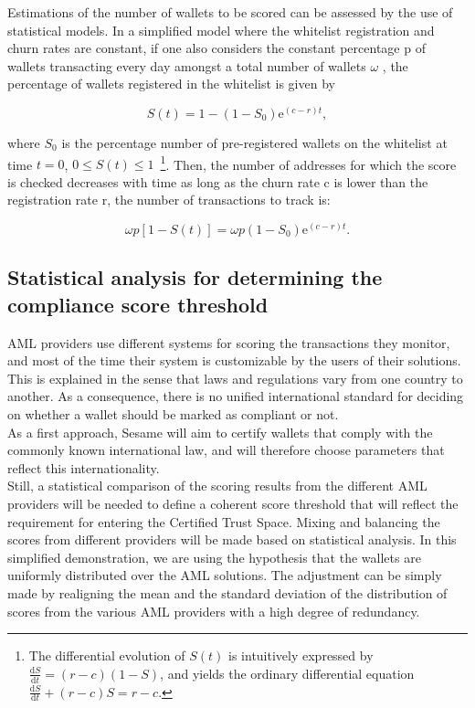 ﻿\documentclass[a4paper]{article}
\begin{document}
Estimations of the number of wallets to be scored can be assessed by the use of statistical models. In a simplified model where the whitelist registration and churn rates are constant, if one also considers the constant percentage p of wallets transacting every day amongst a total number of wallets $\omega$ , the percentage of wallets registered in the whitelist is given by  

$$S(t)=1-\left(1-S_0\right)\mathrm{e}^{(c-r)t},$$

\noindent where $S_0$ is the percentage number of pre-registered wallets on the whitelist at time $t=0$, $0\le S(t)\le 1$~\footnote{The differential evolution of $S(t)$ is intuitively expressed by $\frac{\mathrm{d}S}{\mathrm{d}t}=(r-c)(1-S)$, and yields the ordinary differential equation $\frac{\mathrm{d}S}{\mathrm{d}t}+(r-c)S=r-c$.}.
Then, the number of addresses for which the score is checked decreases with time as long as the churn rate c is lower than the registration rate r, the number of transactions to track is:

$$\omega p\left[1-S(t)\right]=\omega p\left(1-S_0\right)\mathrm{e}^{(c-r)t}.$$

\subsection{Statistical analysis for determining the compliance score threshold}
AML providers use different systems for scoring the transactions they monitor, and most of the time their system is customizable by the users of their solutions. This is explained in the sense that laws and regulations vary from one country to another. As a consequence, there is no unified international standard for deciding on whether a wallet should be marked as compliant or not. \\

As a first approach, Sesame will aim to certify wallets that comply with the commonly known international law, and will therefore choose parameters that reflect this internationality. \\

Still, a statistical comparison of the scoring results from the different AML providers will be needed to define a coherent score threshold that will reflect the requirement for entering the Certified Trust Space. Mixing and balancing the scores from different providers will be made based on statistical analysis. In this simplified demonstration, we are using the hypothesis that the wallets are uniformly distributed over the AML solutions. The adjustment can be simply made by realigning the mean and the standard deviation of the distribution of scores from the various AML providers with a high degree of redundancy. \\
\end{document}
